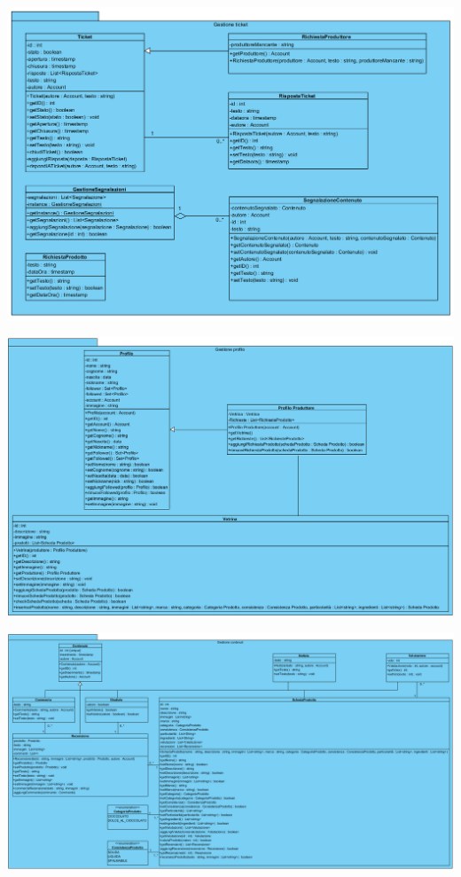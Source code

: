 \begin{center}
			\includegraphics[width=\textwidth]{assets/visualParadigm/classi/GestioneTicket}
\end{center}

\begin{landscape}
\begin{center}
			\includegraphics[width=\linewidth]{assets/visualParadigm/classi/GestioneProfilo}
\end{center}
\end{landscape}

\begin{landscape}
\begin{center}
			\includegraphics[width=1.1\linewidth]{assets/visualParadigm/classi/GestioneContenuti}
\end{center}
\end{landscape}

